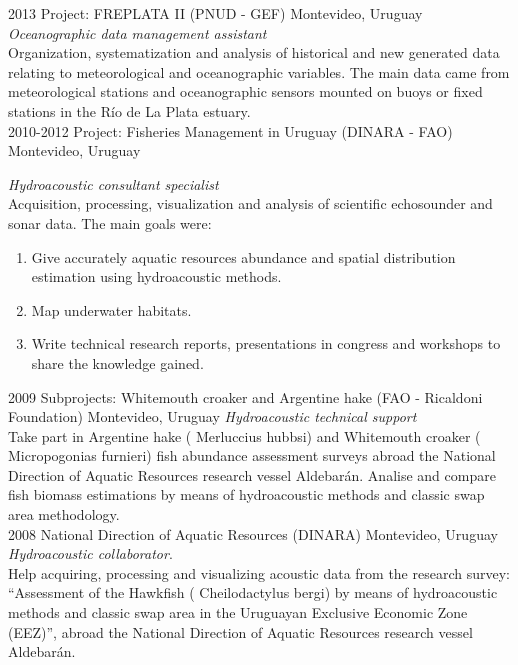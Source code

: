 \documentclass[]{friggeri-cv} %
\begin{document}
\begin{entrylist}
\entry
{2013}
{Project: FREPLATA II (PNUD - GEF)}
{Montevideo, Uruguay}
{\emph{Oceanographic data management assistant} \\ Organization, systematization and analysis of historical and new generated data relating to meteorological and oceanographic variables. The main data came from meteorological stations and oceanographic sensors mounted on buoys or fixed stations in the Río de La Plata estuary. \\}
\entry
{2010-2012}
{Project: Fisheries Management in Uruguay (DINARA - FAO)}
{Montevideo, Uruguay}
{\emph{Hydroacoustic consultant specialist} \\Acquisition, processing, visualization and analysis of scientific echosounder and sonar data. The main goals were:
	\begin{enumerate}
		\item Give accurately aquatic resources abundance and spatial distribution estimation using hydroacoustic methods.
		\item Map underwater habitats.
		\item Write technical research reports, presentations in congress and workshops to share the knowledge gained.\\   
	\end{enumerate}
	}
\entry
{2009}
{Subprojects: Whitemouth croaker and Argentine hake (FAO - Ricaldoni Foundation)}
{Montevideo, Uruguay}
{\emph{Hydroacoustic technical support}\\Take part in Argentine hake ({\sppfont \color{textcolor} Merluccius hubbsi}) and Whitemouth croaker ({\sppfont \color{textcolor} Micropogonias furnieri}) fish abundance assessment surveys abroad the National Direction of Aquatic Resources research vessel Aldebarán. Analise and compare fish biomass estimations by means of hydroacoustic methods and classic swap area methodology.\\}
\entry
{2008}
{National Direction of Aquatic Resources (DINARA)}
{Montevideo, Uruguay}
{\emph{Hydroacoustic collaborator}. \\ Help acquiring, processing and visualizing acoustic data from the research survey: ``Assessment of the Hawkfish ({\sppfont \color{textcolor} Cheilodactylus bergi}) by means of hydroacoustic methods and classic swap area in the Uruguayan Exclusive Economic Zone (EEZ)'', abroad the National Direction of Aquatic Resources research vessel Aldebarán.}
\end{entrylist}
\end{document}
